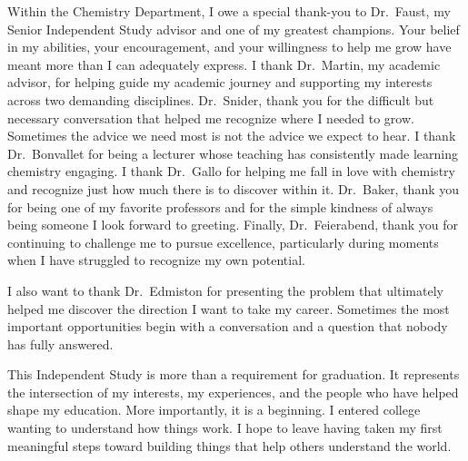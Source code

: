 Within the Chemistry Department, I owe a special thank-you to Dr.~Faust,
my Senior Independent Study advisor and one of my greatest champions.
Your belief in my abilities, your encouragement, and your willingness
to help me grow have meant more than I can adequately express. I thank
Dr.~Martin, my academic advisor, for helping guide my academic journey
and supporting my interests across two demanding disciplines. Dr.~Snider,
thank you for the difficult but necessary conversation that helped me
recognize where I needed to grow. Sometimes the advice we need most is
not the advice we expect to hear. I thank Dr.~Bonvallet for being a
lecturer whose teaching has consistently made learning chemistry
engaging. I thank Dr.~Gallo for helping me fall in love with chemistry
and recognize just how much there is to discover within it. Dr.~Baker,
thank you for being one of my favorite professors and for the simple
kindness of always being someone I look forward to greeting. Finally,
Dr.~Feierabend, thank you for continuing to challenge me to pursue
excellence, particularly during moments when I have struggled to
recognize my own potential.

I also want to thank Dr.~Edmiston for presenting the problem that
ultimately helped me discover the direction I want to take my career.
Sometimes the most important opportunities begin with a conversation
and a question that nobody has fully answered.

This Independent Study is more than a requirement for graduation. It
represents the intersection of my interests, my experiences, and the
people who have helped shape my education. More importantly, it is a
beginning. I entered college wanting to understand how things work.
I hope to leave having taken my first meaningful steps toward building
things that help others understand the world.